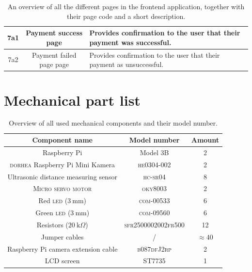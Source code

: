 \begin{appendices}
\begin{table}[hpt]
\begin{tabular}{|c|c|p{9cm}|}
         \hline 
         7a1 & Payment success page & Provides confirmation to the user that their payment was successful. \\
         \hline 
         7a2 & Payment failed page page & Provides confirmation to the user that their payment as unsuccessful. \\
         \hline 
    \end{tabular}
    \caption[An overview of all the different pages in the frontend application.]{An overview of all the different pages in the frontend application, together with their page code and a short description.}
    \label{tab:app-pages}
\end{table}

\clearpage

\section{Mechanical part list}\label{app:part-list}

\begin{table}[htp]
    \centering
    \caption{Overview of all used mechanical components and their model number.}
    \begin{tabular}{|c|c|c|}
        \hline
         \textbf{Component name} & \textbf{Model number} & \textbf{Amount}  \\
         \hline
         \hline
         Raspberry Pi & Model 3B & 2 \\
         \hline
         \textsc{dorhea} Raspberry Pi Mini Kamera & \textsc{he0304-002} & 2 \\
         \hline
         Ultrasonic distance measuring sensor & \textsc{hc-sr04} & 8 \\
         \hline
         \textsc{Micro servo motor} & \textsc{oky8003} & 2 \\
         \hline
         Red \textsc{led} ($3 \ \text{mm}$) & \textsc{com-00533} & 6 \\
         \hline
         Green \textsc{led} ($3 \ \text{mm}$) & \textsc{com-09560} & 6 \\
         \hline
         Resistors ($20 \ \text{k}\Omega$) & \textsc{sfr2500002002fr500} & 12 \\
         \hline
         Jumper cables & / & $\approx 40$ \\
         \hline
         Raspberry Pi camera extension cable & \textsc{b087dfJ2rp} & 2 \\
         \hline
         LCD screen & ST7735 & 1
         \\
         \hline
         \end{tabular}
    \label{tab:part_list}
\end{table}
\clearpage


\end{appendices}
